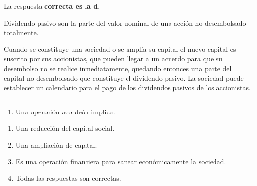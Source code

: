 \documentclass[
  letterpaper,
  DIV=11,
  numbers=noendperiod]{scrreprt}
\providecommand{\tightlist}{%
  \setlength{\itemsep}{0pt}\setlength{\parskip}{0pt}}\usepackage{longtable,booktabs,array}
\begin{document}
\begin{tcolorbox}[enhanced jigsaw, left=2mm, opacityback=0, colback=white, breakable, arc=.35mm, bottomrule=.15mm, rightrule=.15mm, toprule=.15mm, leftrule=.75mm, colframe=quarto-callout-tip-color-frame]
\begin{minipage}[t]{5.5mm}
\textcolor{quarto-callout-tip-color}{\faLightbulb}
\end{minipage}%
\begin{minipage}[t]{\textwidth - 5.5mm}

La respuesta \textbf{correcta es la d}.

Dividendo pasivo son la parte del valor nominal de una acción no
desembolsado totalmente.

Cuando se constituye una sociedad o se amplía su capital el nuevo
capital es suscrito por sus accionistas, que pueden llegar a un acuerdo
para que su desembolso no se realice inmediatamente, quedando entonces
una parte del capital no desembolsado que constituye el dividendo
pasivo. La sociedad puede establecer un calendario para el pago de los
dividendos pasivos de los accionistas.

\end{minipage}%
\end{tcolorbox}

\begin{center}\rule{0.5\linewidth}{0.5pt}\end{center}

\begin{enumerate}
\def\labelenumi{\arabic{enumi}.}
\setcounter{enumi}{39}
\tightlist
\item
  Una operación acordeón implica:
\end{enumerate}

\begin{enumerate}
\def\labelenumi{\alph{enumi})}
\item
  Una reducción del capital social.
\item
  Una ampliación de capital.
\item
  Es una operación financiera para sanear económicamente la sociedad.
\item
  Todas las respuestas son correctas.
\end{enumerate}
\end{document}
